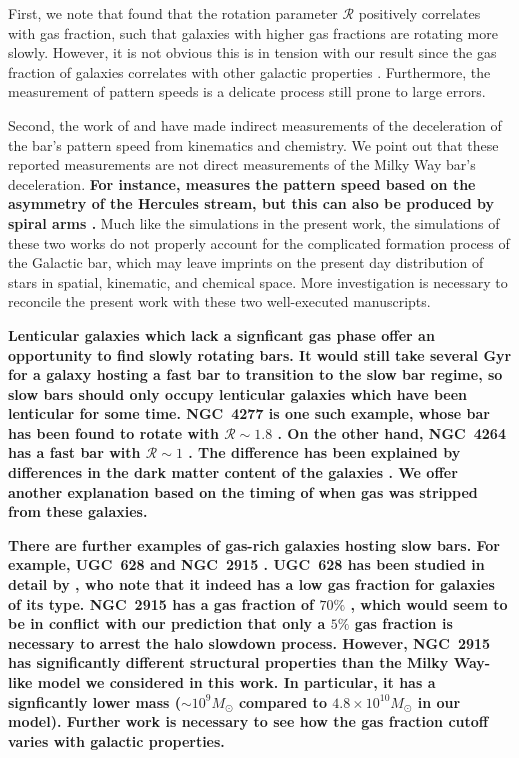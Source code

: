 \documentclass[twocolumn,linenumbers,trackchanges]{aastex631}
\newcommand{\Rot}{\ensuremath{\mathcal{R}}}
\newcommand{\Msun}{\ensuremath{M_{\odot}}}
\begin{document}
First, we note that \citet{2020MNRAS.491.3655G} found that the rotation
parameter \Rot{} positively correlates with gas fraction, such that galaxies
with higher gas fractions are rotating more slowly. However, it is not obvious
this is in tension with our result since the gas fraction of galaxies correlates
with other galactic properties \citep{2009ARAA..47..159B}. Furthermore, the
measurement of pattern speeds is a delicate process still prone to large errors.

Second, the work of \citet{2021MNRAS.500.4710C} and \citet{2021MNRAS.505.2412C}
have made indirect measurements of the deceleration of the bar's pattern speed
from kinematics and chemistry. We point out that these reported measurements are
not direct measurements of the Milky Way bar's deceleration. {\bf For instance,
\citet{2021MNRAS.500.4710C} measures the pattern speed based on the asymmetry of
the Hercules stream, but this can also be produced by spiral arms
\citep{2018MNRAS.481.3794H}.} Much like the simulations in the present work, the
simulations of these two works do not properly account for the complicated
formation process of the Galactic bar, which may leave imprints on the present
day distribution of stars in spatial, kinematic, and chemical space. More
investigation is necessary to reconcile the present work with these two
well-executed manuscripts.

{\bf Lenticular galaxies which lack a signficant gas phase offer an opportunity
to find slowly rotating bars. It would still take several Gyr for a galaxy
hosting a fast bar to transition to the slow bar regime, so slow bars should
only occupy lenticular galaxies which have been lenticular for some time.
NGC~4277 is one such example, whose bar has been found to rotate with
$\Rot{}\sim1.8$ \citep{2022AA...664L..10B}. On the other hand, NGC~4264 has a
fast bar with $\Rot{}\sim1$ \citep{2019MNRAS.488.4972C}. The difference has been
explained by differences in the dark matter content of the galaxies
\citep{2023MNRAS.521.2227B}. We offer another explanation based on the timing of
when gas was stripped from these galaxies.}

{\bf There are further examples of gas-rich galaxies hosting slow bars. For
example, UGC~628 \citep[$\Rot\sim2$;][]{2009AA...499L..25C} and NGC~2915
\citep[$\Rot>1.7$;][]{1999AJ....118.2158B}. UGC~628
has been studied in detail by \citet{2016MNRAS.463.1751C}, who note that it
indeed has a low gas fraction for galaxies of its type. NGC~2915 has a gas
fraction of $70\%$ \citep{2010ApJ...715..656W}, which would seem to be in
conflict with our prediction that only a $5\%$ gas fraction is necessary to
arrest the halo slowdown process. However, NGC~2915 has significantly different
structural properties than the Milky Way-like model we considered in this work.
In particular, it has a signficantly lower mass ($\sim10^9\Msun$ compared to
$4.8\times10^{10}\Msun$ in our model). Further work is necessary to see how the
gas fraction cutoff varies with galactic properties.}
\end{document}
